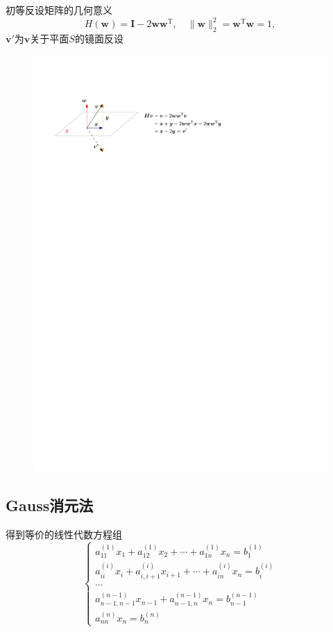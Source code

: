 \begin{note}
    初等反设矩阵的几何意义
    \[
        H(\boldsymbol{w}) = \boldsymbol{I}-2\boldsymbol{w}\boldsymbol{w}^{\mathrm{T}},\quad \|\boldsymbol{w}\|_2^2=\boldsymbol{w}^{\mathrm{T}}\boldsymbol{w}=1,
    \]
    $\boldsymbol{v}'$为$\boldsymbol{v}$关于平面$S$的镜面反设
    \begin{figure}[htbp]
        \centering
        \includegraphics{image/Householder变换.pdf}
    \end{figure}
\end{note}
\subsection{Gauss消元法}
得到等价的线性代数方程组
\[
    \left\{
        \begin{aligned}
            a_{11}^{(1)}x_{1}+a_{12}^{(1)}x_{2}+\cdots+a_{1n}^{(1)}x_{n}=b_{1}^{(1)}\\
            a_{ii}^{(i)}x_{i}+a_{i,i+1}^{(i)}x_{i+1}+\cdots+a_{in}^{(i)}x_{n}=b_{i}^{(i)}\\
            \cdots\\
            a_{n-1,n-1}^{(n-1)}x_{n-1}+a_{n-1,n}^{(n-1)}x_{n}=b_{n-1}^{(n-1)}\\
            a_{nn}^{(n)}x_{n}=b_{n}^{(n)}
        \end{aligned} 
    \right.
\]
    
